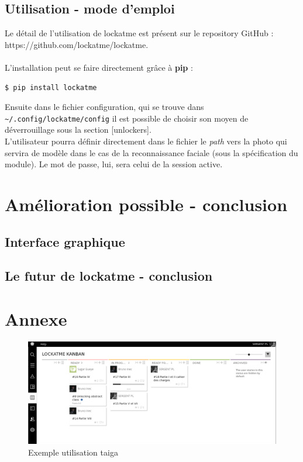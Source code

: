 \documentclass[french]{report}
\begin{document}
\section{Utilisation - mode d'emploi}
Le détail de l'utilisation de lockatme est présent sur le repository GitHub :\\
https://github.com/lockatme/lockatme.\\\\
L'installation peut se faire directement grâce à \textbf{pip} :
\begin{lstlisting}[language=bash]
  $ pip install lockatme
\end{lstlisting}

Ensuite dans le fichier configuration, qui se trouve dans \verb|~/.config/lockatme/config|
il est possible de choisir son moyen de déverrouillage sous la section [unlockers].
\\
L'utilisateur pourra définir directement dans le fichier le \emph{path} vers la photo qui servira
de modèle dans le cas de la reconnaissance faciale (sous la spécification du module). Le mot de passe, lui, sera celui de
la session active.

\chapter{Amélioration possible - conclusion}

\newpage

\section{Interface graphique}

\section{Le futur de lockatme - conclusion}

\chapter*{Annexe}

\begin{figure}[h]\label{fig:Taiga}
  \includegraphics[width=\linewidth]{taiga2}
  \caption{Exemple utilisation taiga}
  \label{fig:Taiga}
\end{figure}
\end{document}
